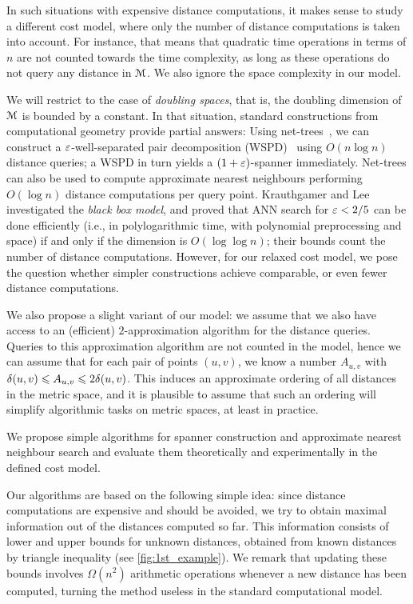 In such situations with expensive distance computations, 
it makes sense to study a different cost model, where only the number of distance computations
is taken into account. For instance, that means that quadratic time operations in terms of $n$
are not counted towards the time complexity, as long as these operations do not query any distance
in $\mathcal{M}$. We also ignore the space complexity in our model.

We will restrict to the case of \emph{doubling spaces}, that is, the doubling dimension
of $\mathcal{M}$ is bounded by a constant. 
In that situation, standard constructions from computational geometry provide partial answers:
Using net-trees~\cite{hm-fast}, we can construct a $\varepsilon$-well-separated pair decomposition (WSPD)~\cite{CK-decomposition} using $O(n\log n)$ distance queries; a WSPD in turn yields
a {$(1+\varepsilon)$-spanner} immediately. Net-trees can also be used to compute approximate nearest neighbours
performing $O(\log n)$ distance computations per query point.
Krauthgamer and Lee \cite{krauthgamer2005black} investigated the \textit{black box model},
and proved that ANN search for $\varepsilon < 2/5$ can be done efficiently (i.e., in polylogarithmic time, with polynomial preprocessing
and space) if and only if the dimension is $O(\log \log n)$; their bounds count the number of distance computations.
However, for our relaxed cost model, we pose the question whether simpler constructions achieve
comparable, or even fewer distance computations.

We also propose a slight variant of our model: we assume that we also have access to an (efficient)
$2$-approximation algorithm for the distance queries. Queries to this approximation algorithm
are not counted in the model, hence we can assume that for each pair of points $(u,v)$, we
know a number $A_{u,v}$ with $\delta(u,v)\leqslant A_{u,v}\leqslant 2\delta(u,v)$. This induces an approximate ordering
of all distances in the metric space, and it is plausible to assume that such an ordering will simplify
algorithmic tasks on metric spaces, at least in practice.

%
We propose simple algorithms for spanner construction and approximate nearest neighbour search
and evaluate them theoretically and experimentally in the defined cost model.

Our algorithms are based on the following simple idea: since distance computations are expensive
and should be avoided, we try to obtain maximal information out of the distances computed
so far. 
This information consists of lower and upper bounds for unknown distances, obtained from known distances
by triangle inequality (see \cref{fig:1st_example}). We remark that updating these bounds involves $\Omega(n^2)$ arithmetic
operations whenever a new distance has been computed, turning the method useless in the standard computational model.

